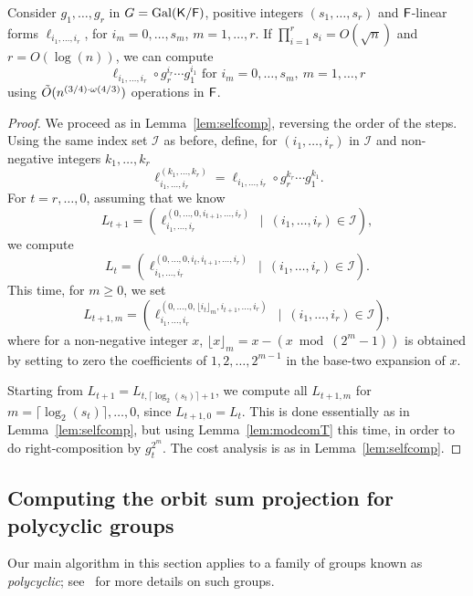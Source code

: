 \begin{lemma}
  \label{lem:transmodcomp}
  Consider $g_1, \ldots, g_r$ in $G=\mathrm{Gal}({\mathsf{K}}/{\mathsf{F}})$, positive
  integers $(s_1, \ldots, s_r)$ and ${\mathsf{F}}$-linear forms $\ell_{i_1,
    \dots, i_r}$, for $i_m=0,\dots,s_m$, $m=1,\dots,r$. If $\prod_{i =
    1}^r s_i = O(\sqrt{n})$ and $r = O(\log(n))$, we can compute
  $$\ell_{i_1, \dots, i_r} \circ g_r^{i_r}\cdots g_1^{i_1}
  \text{~for~} i_m=0,\dots,s_m,\ m=1,\dots,r
  $$  using $\tilde{O}(n^{(3/4)\cdot \omega(4/3)})$ operations in ${\mathsf{F}}$.
\end{lemma} 
\begin{proof}
  We proceed as in Lemma~\ref{lem:selfcomp}, reversing the order of
  the steps. Using the same index set $\mathcal I$ as before, define,
  for $(i_1,\dots,i_r)$ in $\mathcal I$ and non-negative integers
  $k_1,\dots,k_r$
  $$\ell_{i_1,\dots,i_r}^{(k_1,\dots,k_r)} =\ell_{i_1,\dots,i_r} \circ g_r^{k_r}\cdots g_1^{k_1}.$$
  For $t=r,\dots,0$, assuming that
  we know 
  $$L_{t+1} = (\ell_{i_1, \dots,i_r}^{(0, \dots, 0,i_{t+1},\dots,i_r)} \ \mid
  \ (i_1,\dots,i_r)\in \mathcal I),$$ we compute 
  $$L_{t}=(\ell_{i_1, \dots,i_r}^{(0, \dots, 0,i_{t},i_{t+1},\dots,i_r)}
  \ \mid \ (i_1,\dots,i_r)\in \mathcal I).$$
  This time, for $m \ge 0$, we set
  $$L_{t+1,m} = (\ell_{i_1, \dots,i_r}^{(0, \dots, 0,\lfloor i_{t}
    \rfloor_m,i_{t+1},\dots,i_r)} \ \mid \ (i_1,\dots,i_r)\in \mathcal
  I),$$ where for a non-negative integer $x$, $\lfloor x \rfloor_m = x
  - (x \bmod (2^m-1))$ is obtained by setting to zero the coefficients
  of $1,2,\dots,2^{m-1}$ in the base-two expansion of $x$.

  Starting from $L_{t+1} = L_{t, \lceil \log_2(s_t) \rceil +1}$, we
  compute all $L_{t+1,m}$ for $m= \lceil \log_2(s_t) \rceil,\dots,0$,
  since $L_{t+1,0} = L_{t}$. This is done essentially as in
  Lemma~\ref{lem:selfcomp}, but using Lemma~\ref{lem:modcomT} this
  time, in order to do right-composition by $g_t^{2^m}$.
  The cost analysis is as in Lemma~\ref{lem:selfcomp}.
\end{proof}


\subsection{Computing the orbit sum projection for polycyclic groups}
\label{ssec:proj_abelian}

Our main algorithm in this section applies to a family of groups known
as {\em polycyclic}; see~\cite[Chapter 8]{HoEiOb05} for more details
on such groups.

